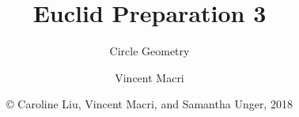 

\usepackage{adjustbox}
\usepackage{wrapfig}
\usepackage{tikz}
\usetikzlibrary{angles,quotes}

\title{Euclid Preparation 3}
\subtitle{Circle Geometry}
\author{Vincent Macri}
\date{\copyright{} Caroline Liu, Vincent Macri, and Samantha Unger, 2018}


	\frame{\titlepage}
	

